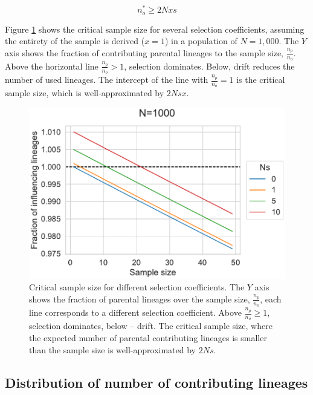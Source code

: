 \documentclass[review]{elsarticle}
\begin{document}
\begin{equation}
  \label{eq:critical-sample}
  n_o^* \ge 2Nxs
\end{equation}


Figure \ref{fig:critical-sample-size} shows the critical sample size for several selection
coefficients, assuming the entirety of the sample is derived ($x=1$) in a population of $N=1,000$.
The $Y$ axis shows the fraction of contributing parental lineages to the sample size,
$\frac{n_p}{n_o}$. Above the horizontal line $\frac{n_p}{n_o} > 1$, selection dominates. Below,
drift reduces the number of used lineages. The intercept of the line with $\frac{n_p}{n_o} = 1$ is
the critical sample size, which is well-approximated by $2Nsx$.

\begin{figure}
  \centering
  \includegraphics{fig/critical_sample_size.pdf}
  \caption{Critical sample size for different selection coefficients. The $Y$ axis shows the
    fraction of parental lineages over the sample size, $\frac{n_p}{n_o}$, each line corresponds to a
    different selection coefficient. Above $\frac{n_p}{n_o}\ge 1$, selection dominates, below -- drift.
    The critical sample size, where the expected number of parental contributing lineages is smaller
    than the sample size is well-approximated by $2Ns$.}
  \label{fig:critical-sample-size}
\end{figure}

\subsection{Distribution of number of contributing lineages}
\label{subsec:distribution}
\end{document}
